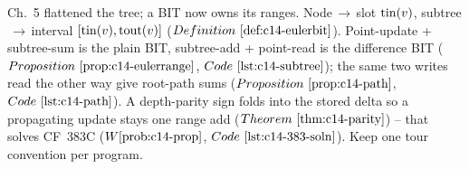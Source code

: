 \begin{recallbox}
Ch.~5 flattened the tree; a BIT now owns its ranges.  Node\(\,\to\,\)slot
\(\operatorname{tin}(v)\), subtree\(\,\to\,\)interval \([\operatorname{tin}(v),\operatorname{tout}(v)]\)
(\(\defref{c14-eulerbit}\)).  Point-update + subtree-sum is the plain BIT,
subtree-add + point-read is the difference BIT (\(\propref{c14-eulerrange}\),
\(\coderef{c14-subtree}\)); the same two writes read the other way give
root-path sums (\(\propref{c14-path}\), \(\coderef{c14-path}\)).  A depth-parity
sign folds into the stored delta so a propagating update stays one range add
(\(\thmref{c14-parity}\)) -- that solves CF~383C
(\(\probref{c14-prop}\), \(\coderef{c14-383-soln}\)).  Keep one tour
convention per program.
\end{recallbox}
